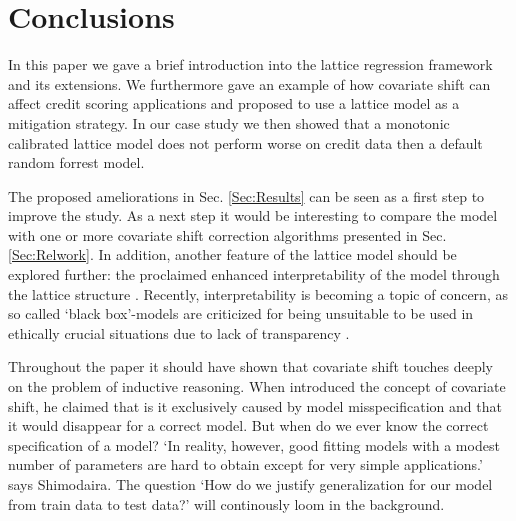 \section{Conclusions}\label{Sec:Conc}

In this paper we gave a brief introduction into the lattice regression framework and its extensions. We furthermore gave an example of how covariate shift can affect credit scoring applications and proposed to use a lattice model as a mitigation strategy. In our case study we then showed that a monotonic calibrated lattice model does not perform worse on credit data then a default random forrest model. 

The proposed ameliorations in Sec. \ref{Sec:Results} can be seen as a first step to improve the study. As a next step it would be interesting to compare the model with one or more covariate shift correction algorithms presented in Sec. \ref{Sec:Relwork}.  In addition, another feature of the lattice model should be explored further: the proclaimed enhanced interpretability of the model through the lattice structure \citep{gupta2016monotonic}. Recently, interpretability is becoming a topic of concern, as so called `black box'-models are criticized for being unsuitable to be used in ethically crucial situations due to lack of transparency \citep{rudin2019stop}. 

Throughout the paper it should have shown that covariate shift touches deeply on the problem of inductive reasoning. When \citep{shimodaira2000improving} introduced the concept of covariate shift, he claimed that is it exclusively caused by model misspecification and that it would disappear for a correct model. But when do we ever know the correct specification of a model? `In reality, however, good fitting models with a modest number of parameters are hard to obtain except for very simple applications.' \citep[p.~202]{quionero2009dataset} says Shimodaira. The question `How do we justify generalization for our model from train data to test data?' will continously loom in the background.
